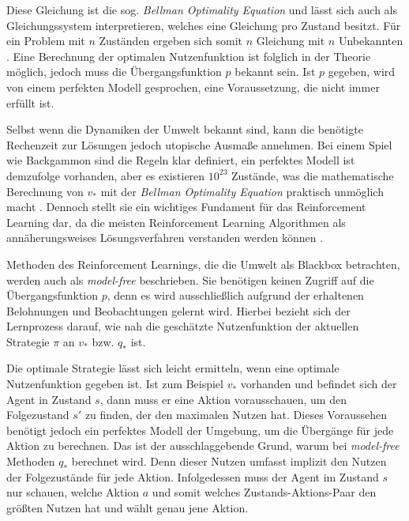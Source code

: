 Diese Gleichung ist die sog. \textit{Bellman Optimality Equation} und lässt sich auch als Gleichungssystem interpretieren, welches eine Gleichung pro Zustand besitzt. Für ein Problem mit $n$ Zuständen ergeben sich somit $n$ Gleichung mit $n$ Unbekannten \cite[S.~63]{Sutton1998}. Eine Berechnung der optimalen Nutzenfunktion ist folglich in der Theorie möglich, jedoch muss die Übergangsfunktion $p$ bekannt sein. Ist $p$ gegeben, wird von einem perfekten Modell gesprochen, eine Voraussetzung, die nicht immer erfüllt ist.
\par 
Selbst wenn die Dynamiken der Umwelt bekannt sind, kann die benötigte Rechenzeit zur Lösungen jedoch utopische Ausmaße annehmen. Bei einem Spiel wie \glqq Backgammon\grqq{} sind die Regeln klar definiert, ein perfektes Modell ist demzufolge vorhanden, aber es existieren $10^{23}$ Zustände, was die mathematische Berechnung von $v_*$ mit der \textit{Bellman Optimality Equation} praktisch unmöglich macht \cite[S.~66]{Sutton1998}. Dennoch stellt sie ein wichtiges Fundament für das Reinforcement Learning dar, da die meisten Reinforcement Learning Algorithmen als annäherungsweises Lösungsverfahren verstanden werden können \cite[S.~66]{Sutton1998}. 
\par 
Methoden des Reinforcement Learnings, die die Umwelt als Blackbox betrachten, werden auch als \textit{model-free} beschrieben. Sie benötigen keinen Zugriff auf die Übergangsfunktion $p$, denn es wird ausschließlich aufgrund der erhaltenen Belohnungen und Beobachtungen gelernt wird. Hierbei bezieht sich der Lernprozess darauf, wie nah die geschätzte Nutzenfunktion der aktuellen Strategie $\pi$ an $v_*$ bzw. $q_*$ ist.
\par 
Die optimale Strategie lässt sich leicht ermitteln, wenn eine optimale Nutzenfunktion gegeben ist. Ist zum Beispiel $v_*$ vorhanden und befindet sich der Agent in Zustand $s$, dann muss er eine Aktion vorausschauen, um den Folgezustand $s'$ zu finden, der den maximalen Nutzen hat. Dieses Voraussehen benötigt jedoch ein perfektes Modell der Umgebung, um die Übergänge für jede Aktion zu berechnen. Das ist der ausschlaggebende Grund, warum bei \textit{model-free} Methoden $q_*$ berechnet wird. Denn dieser Nutzen umfasst implizit den Nutzen der Folgezustände für jede Aktion. Infolgedessen muss der Agent im Zustand $s$ nur schauen, welche Aktion $a$ und somit welches Zustands-Aktions-Paar den größten Nutzen hat und wählt genau jene Aktion.
\par 

\par 
